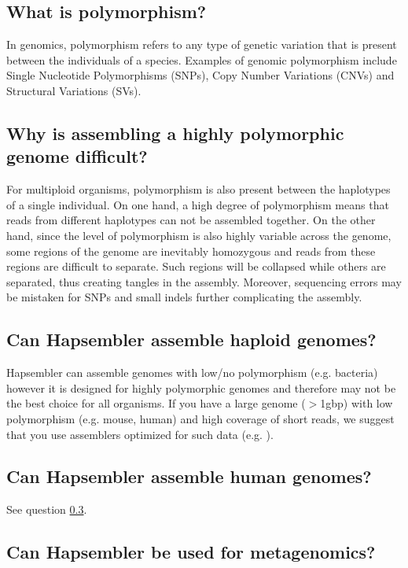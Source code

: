 \documentclass[12pt,a4paper]{report}
\begin{document}
\subsection{What is polymorphism?}

In genomics, polymorphism refers to any type of genetic variation that is present between the individuals of a species. Examples of genomic polymorphism include Single Nucleotide Polymorphisms (SNPs), Copy Number Variations (CNVs) and Structural Variations (SVs).

\subsection{Why is assembling a highly polymorphic genome difficult?}

For multiploid organisms, polymorphism is also present between the haplotypes of a single individual. On one hand, a high degree of polymorphism means that reads from different haplotypes can not be assembled together. On the other hand, since the level of polymorphism is also highly variable across the genome, some regions of the genome are inevitably homozygous and reads from these regions are difficult to separate. Such regions will be collapsed while others are separated, thus creating tangles in the assembly. Moreover, sequencing errors may be mistaken for SNPs and small indels further complicating the assembly.

\subsection{Can Hapsembler assemble haploid genomes?}
\label{haploid}

Hapsembler can assemble genomes with low/no polymorphism (e.g. bacteria) however it is designed for highly polymorphic genomes and therefore may not be the best choice for all organisms. If you have a large genome ($>$1gbp) with low polymorphism (e.g. mouse, human) and high coverage of short reads, we suggest that you use assemblers optimized for such data (e.g. \cite{simpson}).

\subsection{Can Hapsembler assemble human genomes?}

See question \ref{haploid}.

\subsection{Can Hapsembler be used for metagenomics?}
\end{document}
